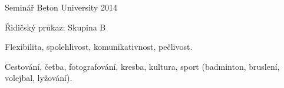\vspace{3mm}

\begin{cvhonors}
  \cvhonor
    {Seminář Beton University 2014} %
\end{cvhonors}

\begin{cvhonors}
  \cvhonor
    {Řidičský průkaz: Skupina B} %
\end{cvhonors}


\begin{cvhonors}
  \cvhonor
    {Flexibilita, spolehlivost, komunikativnost, pečlivost.} %
\end{cvhonors}

\begin{cvhonors}
  \cvhonor
    {Cestování, četba, fotografování, kresba, kultura, sport (badminton, bruslení, volejbal, lyžování).} %
\end{cvhonors}



